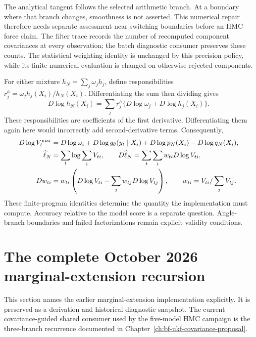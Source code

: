 The analytical tangent follows the selected arithmetic branch. At a boundary
where that branch changes, smoothness is not asserted. This numerical repair
therefore needs separate assessment near switching boundaries before an HMC
force claim. The filter trace records the number of recomputed component
covariances at every observation; the batch diagnostic consumer preserves
these counts. The statistical weighting identity is unchanged by this
precision policy, while its finite numerical evaluation is changed on
otherwise rejected components.

For either mixture $h_N=\sum_j\omega_jh_j$, define responsibilities
$r_j^h=\omega_jh_j(X_i)/h_N(X_i)$. Differentiating the sum then dividing gives
\begin{equation}
 D\log h_N(X_i)=\sum_j r_j^h
                   \{D\log\omega_j+D\log h_j(X_i)\}.
 \label{eq:bf-marginal-mixture-tangent}
\end{equation}
These responsibilities are coefficients of the first derivative.
Differentiating them again here would incorrectly add second-derivative terms.
Consequently,
\begin{align}
 D\log V_i^{\rm mar}
 &=D\log\omega_i+D\log g_\theta(y_t\mid X_i)
                    +D\log p_N(X_i)-D\log q_N(X_i),\notag\\
 \widehat\ell_N&=\sum_t\log\sum_iV_{ti},\qquad
 D\widehat\ell_N=\sum_t\sum_i w_{ti}D\log V_{ti},\notag\\
 Dw_{ti}&=w_{ti}\left(D\log V_{ti}-\sum_jw_{tj}D\log V_{tj}\right),
 \qquad w_{ti}=V_{ti}/\sum_jV_{tj}.
 \label{eq:bf-marginal-filter-score}
\end{align}
These finite-program identities determine the quantity the implementation
must compute. Accuracy relative to the model score is a separate question.
Angle-branch boundaries and failed factorizations remain explicit validity
conditions.

\section{The complete October 2026 marginal-extension recursion}
\label{sec:bf-pfpf-current-recursion}

This section names the earlier marginal-extension implementation explicitly.
It is preserved as a derivation and historical diagnostic snapshot.  The
current covariance-guided shared consumer used by the five-model HMC campaign
is the three-branch recurrence documented in Chapter~\ref{ch:bf-ukf-covariance-proposal}.

